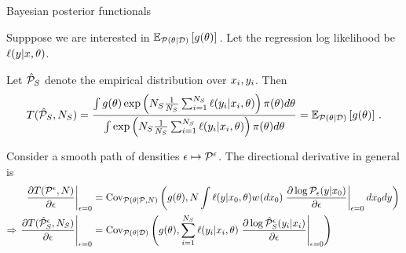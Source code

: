 \begin{frame}[t]{Bayesian posterior functionals}

Supppose we are interested in $\mathbb{E}_{\mathcal{P}(\theta \vert \mathcal{D})}\left[ g(\theta)\right]\,$.
Let the regression log likelihood be $\ell(y \vert x, \theta)$.\\[1em]

\generalizedpost{}

Let ${{\hat{\mathcal{P}}_{S}}}$ denote the empirical distribution over $x_i, y_i$.  Then
%
\begin{align*}
    T({{\hat{\mathcal{P}}_{S}}}, {{N_S}}) =
    \frac{
        \int g(\theta) \exp\left( {{N_S}} \frac{1}{{{N_S}}} \sum_{i=1}^{{N_S}} \ell(y_i \vert x_i, \theta) \right)
            \pi(\theta) d\theta
    }
    {
    \int \exp\left( {{N_S}} \frac{1}{{{N_S}}} \sum_{i=1}^{{N_S}} \ell(y_i \vert x_i, \theta) \right)
        \pi(\theta) d\theta
    } = \mathbb{E}_{\mathcal{P}(\theta \vert \mathcal{D})}\left[ g(\theta)\right]\,.
\end{align*}


Consider a smooth path of densities $\epsilon \mapsto \mathcal{P}^\epsilon$. 
The directional derivative in general is
$$
\begin{aligned}
\left. \frac{\partial T(\mathcal{P}^\epsilon, N)}{\partial \epsilon} \right|_{\epsilon=0} ={}&
    \mathrm{Cov}_{\mathcal{P}(\theta \vert \mathcal{P}, N)}\left( 
        g(\theta), 
        N \int \ell(y \vert x_{0}, \theta) w^{}(d x_{0})
        \left. \frac{\partial \log \mathcal{P}_\epsilon(y \vert x_{0})}{\partial \epsilon} \right|_{\epsilon = 0} dx_{0} dy
    \right)\,
\\\Rightarrow
\left. \frac{\partial T({{{\hat{\mathcal{P}}_{S}}}}^\epsilon, {{N_S}})}{\partial \epsilon} \right|_{\epsilon=0} ={}&
    \mathrm{Cov}_{\mathcal{P}(\theta \vert \mathcal{D})}\left( 
        g(\theta), 
        \sum_{i=1}^{{N_S}} \ell(y_i \vert x_i, \theta)
        \left. \frac{\partial \log {{{\hat{\mathcal{P}}_{S}}}}^\epsilon(y_i \vert x_i)}{\partial \epsilon} \right|_{\epsilon = 0}
    \right)\,
\end{aligned}
$$

\end{frame}




